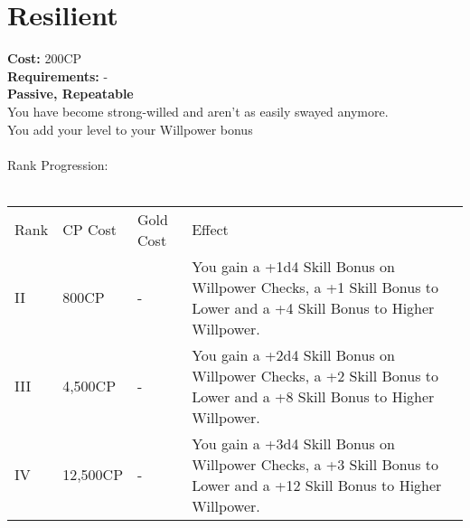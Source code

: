 \section{Resilient}\label{perk:resilient}
\textbf{Cost:} 200CP\\
\textbf{Requirements:} -\\
\textbf{Passive, Repeatable}\\
You have become strong-willed and aren't as easily swayed anymore.\\
You add your level to your Willpower bonus\\
\\
Rank Progression:\\
\\
\begin{tabular}{l | l | l | l}
	Rank & CP Cost & Gold Cost & Effect\\
	II & 800CP & - & You gain a +1d4 Skill Bonus on Willpower Checks, a +1 Skill Bonus to Lower and a +4 Skill Bonus to Higher Willpower.\\
	III & 4,500CP & - & You gain a +2d4 Skill Bonus on Willpower Checks, a +2 Skill Bonus to Lower and a +8 Skill Bonus to Higher Willpower.\\
	IV & 12,500CP & - & You gain a +3d4 Skill Bonus on Willpower Checks, a +3 Skill Bonus to Lower and a +12 Skill Bonus to Higher Willpower.\\
\end{tabular}
